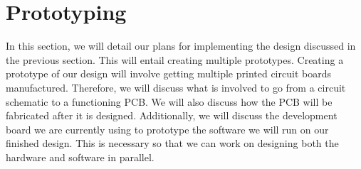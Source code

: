 \section{Prototyping}
In this section, we will detail our plans for implementing the design discussed in the previous section. This will entail creating multiple prototypes. Creating a prototype of our design will involve getting multiple printed circuit boards manufactured. Therefore, we will discuss what is involved to go from a circuit schematic to a functioning PCB. We will also discuss how the PCB will be fabricated after it is designed. Additionally, we will discuss the development board we are currently using to prototype the software we will run on our finished design. This is necessary so that we can work on designing both the hardware and software in parallel.

